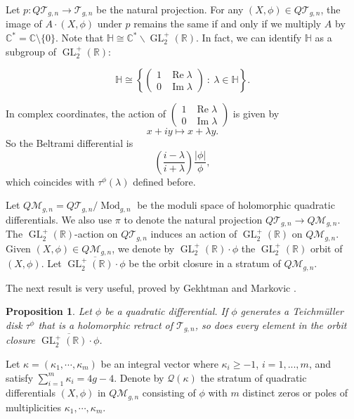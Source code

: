 \documentclass[11pt]{amsart}
\theoremstyle{plain}
\newtheorem{Proposition}[Theorem]{Proposition}
\newcommand{\Tei}{\mathcal{T}}
\newcommand{\Mod}{\operatorname{Mod}}
\begin{document}
Let $p: Q\Tei_{g,n} \to \Tei_{g,n}$ be the natural projection. 
For any $(X,\phi) \in  Q\Tei_{g,n}$, the image of $A \cdot (X,\phi)$ under $p$
remains the same if and only if we multiply $A$ by $\mathbb{C}^*=\mathbb{C}\setminus\{0\}$. 
Note that $\mathbb{H} \cong  \mathbb{C}^* \backslash \operatorname{GL}_2^+(\mathbb{R})$. In fact, we can identify $\mathbb{H}$
as a subgroup of $\operatorname{GL}_2^+(\mathbb{R})$:

$$\mathbb{H} \cong\left\{\begin{pmatrix}
    1 & \operatorname{Re} \lambda\\
    0 & \operatorname{Im} \lambda
\end{pmatrix} \ : \  \lambda\in \mathbb{H} \right\}.$$

In complex coordinates, the action of $\begin{pmatrix}
    1 & \operatorname{Re} \lambda\\
    0 & \operatorname{Im} \lambda
\end{pmatrix}$ is given by 
$$x+i y \mapsto x + \lambda y.$$
So the Beltrami differential is $$\left( \frac{i-\lambda}{i+\lambda}  \right) \frac{|\phi|}{\phi},$$
which coincides with $\tau^\phi(\lambda)$ defined before.


Let $Q\mathcal{M}_{g,n} = Q\Tei_{g,n} / \Mod_{g,n}$ be the moduli space of holomorphic quadratic differentials. 
We also use $\pi$ to denote the natural projection $ Q\Tei_{g,n} \to Q\mathcal{M}_{g,n}$. The $\operatorname{GL}_2^+(\mathbb{R})$-action on $Q\Tei_{g,n}$ 
induces an action of $\operatorname{GL}_2^+(\mathbb{R})$ on $Q\mathcal{M}_{g,n}$.
Given $(X,\phi)\in Q\mathcal{M}_{g,n}$, we denote by $\operatorname{GL}_2^+(\mathbb{R}) \cdot \phi$ the $\operatorname{GL}_2^+(\mathbb{R})$ orbit of $(X,\phi)$. 
Let $\overline{\operatorname{GL}_2^+(\mathbb{R}) \cdot \phi}$ be the orbit closure in a stratum of $Q\mathcal{M}_{g,n}$.

The next result is very useful, proved by Gekhtman and Markovic \cite[Lemma 2.2]{GM2020}.

\begin{Proposition}\label{lem:GM-orbit}
Let $\phi$ be a quadratic differential. 
    If $\phi$ generates a Teichm\"uller disk $\tau^\phi$ that is a holomorphic retract of $\mathcal{T}_{g,n}$, so does every  element in the  orbit closure  $\overline{\operatorname{GL}_2^+(\mathbb{R}) \cdot \phi}$.
\end{Proposition}




Let 
$ \kappa =(\kappa_1, \cdots, \kappa_m)$ be an integral vector where $\kappa_i \geq -1$, $i = 1,...,m$, and satisfy $\sum\limits_{i=1}^{m} \kappa_i =4g-4.$ 
Denote by $\mathcal{Q}(\kappa)$ the stratum of quadratic differentials $(X,\phi)$ in
$Q\mathcal{M}_{g,n}$ consisting of $\phi$ with $m$ distinct zeros or poles of multiplicities $\kappa_1, \cdots, \kappa_m$. 
\end{document}
